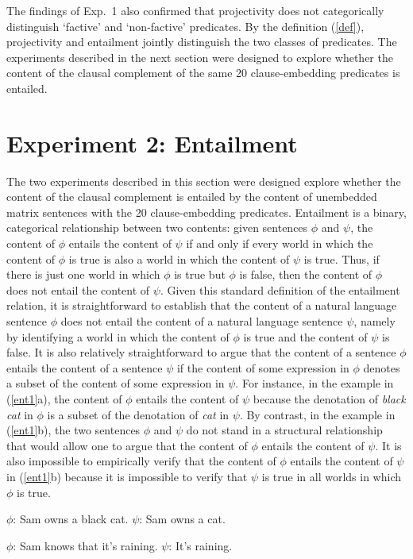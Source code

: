\documentclass[11pt,fleqn]{article}
\newcommand{\6}{\mbox{$[\hspace*{-.6mm}[$}}
\newcommand{\9}{\mbox{$]\hspace*{-.6mm}]$}}
\begin{document}
The findings of Exp.~1 also confirmed that projectivity does not categorically distinguish `factive' and `non-factive' predicates. By the definition (\ref{def}), projectivity and entailment jointly distinguish the two classes of predicates. The experiments described in the next section were designed to explore whether the content of the clausal complement of the same 20 clause-embedding predicates is entailed.

\section{Experiment 2: Entailment}\label{s3}

The two experiments described in this section were designed explore whether the content of the clausal complement is entailed by the content of unembedded matrix sentences with the 20 clause-embedding predicates.  Entailment is a binary, categorical relationship between two contents: given sentences $\phi$ and $\psi$, the content of $\phi$ entails the content of $\psi$ if and only if every world in which the content of $\phi$ is true is also a world in which the content of $\psi$ is true. Thus, if there is just one world in which $\phi$ is true but $\phi$ is false, then the content of $\phi$ does not entail the content of $\psi$. Given this standard definition of the entailment relation, it is straightforward to establish that the content of a natural language sentence $\phi$ does not entail the content of a natural language sentence $\psi$, namely by identifying a world in which the content of $\phi$ is true and the content of $\psi$ is false. It is also relatively straightforward to argue that the content of a sentence $\phi$ entails the content of a sentence $\psi$ if the content of some expression in $\phi$ denotes a subset of the content of some expression in $\psi$. For instance, in the example in (\ref{ent1}a),  the content of $\phi$ entails the content of $\psi$ because the denotation of {\em black cat} in $\phi$ is a subset of the denotation of {\em cat} in $\psi$. By contrast, in the example in (\ref{ent1}b), the two sentences $\phi$ and $\psi$ do not stand in a structural relationship that would allow one to argue that the content of $\phi$ entails the content of $\psi$. It is also impossible to empirically verify that the content of $\phi$ entails the content of $\psi$ in (\ref{ent1}b) because it is impossible to  verify that $\psi$ is true in all worlds in which $\phi$ is true. 

\begin{exe}
\ex\label{ent1}
\begin{xlist}
\ex $\phi$: Sam owns a black cat. \hspace*{1.5cm} $\psi$: Sam owns a cat.

\ex $\phi$: Sam knows that it's raining. \hspace*{.6cm} $\psi$: It's raining.

\end{xlist}
\end{exe}
\end{document}
